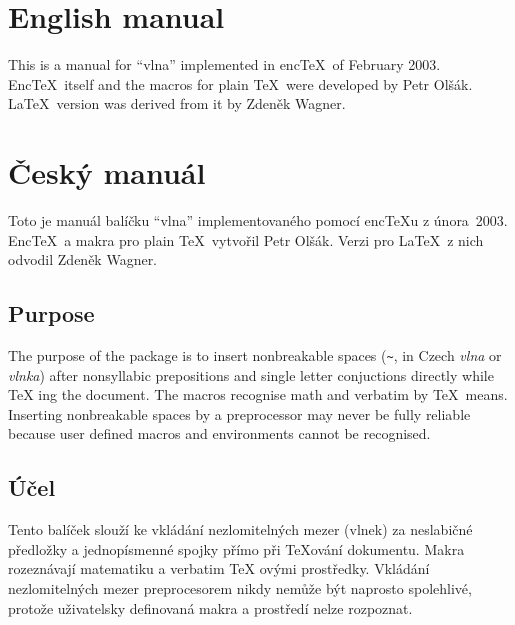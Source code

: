 
\ifeng

\section{English manual}
This is a manual for ``vlna'' implemented in enc\TeX\ of February 2003. Enc\TeX\ itself and the
macros for plain \TeX\ were developed by Petr Olšák. \LaTeX\ version was derived from it by Zdeněk
Wagner.

\else

\section{\texorpdfstring{Český manuál}{Cesky manual}}
Toto je manuál balíčku "`vlna"' implementovaného pomocí enc\TeX{}u z února~2003. Enc\TeX\ a makra
pro plain \TeX\ vytvořil Petr Olšák. Verzi pro \LaTeX\ z nich odvodil Zdeněk Wagner.

\fi


\ifeng

\subsection{Purpose}
The purpose of the package is to insert nonbreakable spaces (\verb:~:, in Czech \textit{vlna} or
\textit{vlnka}) after nonsyllabic prepositions and single letter conjuctions directly while \TeX
ing the document. The macros recognise math and verbatim by \TeX\ means. Inserting nonbreakable
spaces by a preprocessor may never be fully reliable because user defined macros and environments
cannot be recognised.

\else

\subsection{\texorpdfstring{Účel}{Ucel}}
Tento balíček slouží ke vkládání nezlomitelných mezer (vlnek) za neslabičné předložky a
jednopísmenné spojky přímo při \TeX ování dokumentu. Makra rozeznávají matematiku a verbatim \TeX
ovými prostředky. Vkládání nezlomitelných mezer preprocesorem nikdy nemůže být naprosto
spolehlivé, protože uživatelsky definovaná makra a prostředí nelze rozpoznat.

\fi

